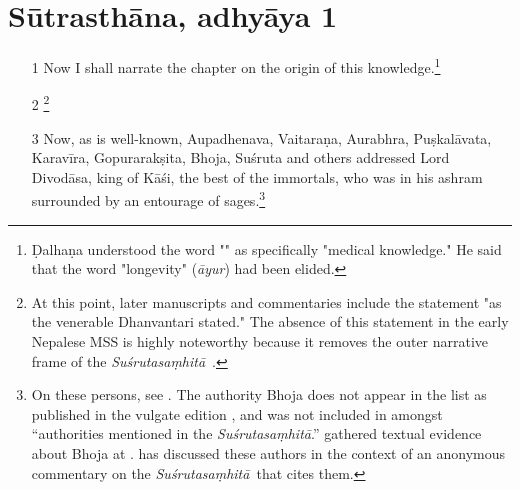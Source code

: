 \documentclass[12pt]{article}
\renewcommand{\SS}{\emph{Suśrutasaṃhitā}}
\begin{document}
    \section{Sūtrasthāna, adhyāya 1}
\begin{itemize}
    \item [1]
    Now I shall narrate the chapter on the origin of this knowledge.\footnote{Ḍalhaṇa 
    understood the word "" as specifically "medical knowledge."  
    He said that the word "longevity" (\emph{āyur}) 
     had been elided.}
    
%    
    
    \item[2]\footnote{At this point, later manuscripts and commentaries include
the statement "as the venerable Dhanvantari stated."  The absence of this
statement in the early Nepalese MSS is highly noteworthy because it removes
the outer narrative frame of the \SS\
\parencites[148]{wuja-2013}[\S\,3.1.2]{kleb-2021b}.} %
    
    \item[3] Now, as is well-known, Aupadhenava, Vaitaraṇa, Aurabhra, Puṣkalāvata,
Karavīra, Gopurarakṣita, Bhoja, Suśruta and others addressed Lord Divodāsa,
king of Kāśi, the best of the immortals, who was in his ashram surrounded by
an entourage of sages.\footnote{On these persons, see \cite[IA
369\,ff.]{meul-hist}. The authority Bhoja does not appear in the list as
published in the vulgate edition \citep[1]{susr-trikamji2}, and was not
included in \cite{meul-hist} amongst “authorities mentioned in the \SS.” 
\citeauthor{meul-hist} gathered textual evidence about Bhoja at \cite[IA
690--691]{meul-hist}. \citet{kleb-2021a} has discussed these authors in the
context of an anonymous commentary on the \SS\ that cites them.}

\nocite{emen-1969}
    
    

\end{itemize}
\end{document}
